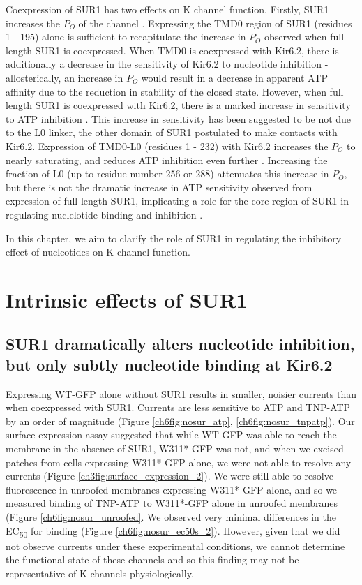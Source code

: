 Coexpression of SUR1 has two effects on K\ATP{} channel function.
Firstly, SUR1 increases the $P_O$ of the channel \cite{tucker_truncation_1997, john_sulphonylurea_1998, chan_n-terminal_2003-1}.
Expressing the TMD0 region of SUR1 (residues 1 - 195) alone is sufficient to recapitulate the increase in $P_O$ observed when full-length SUR1 is coexpressed\cite{babenko_sur_2003-1, chan_n-terminal_2003-1}.
When TMD0 is coexpressed with Kir6.2, there is additionally a decrease in the sensitivity of Kir6.2 to nucleotide inhibition - allosterically, an increase in $P_O$ would result in a decrease in apparent ATP affinity due to the reduction in stability of the closed state.
However, when full length SUR1 is coexpressed with Kir6.2, there is a marked increase in sensitivity to ATP inhibition \cite{tucker_truncation_1997, john_sulphonylurea_1998, chan_n-terminal_2003-1, ribalet_atp-sensitive_2006}.
This increase in sensitivity has been suggested to be not due to the L0 linker, the other domain of SUR1 postulated to make contacts with Kir6.2.
Expression of TMD0-L0 (residues 1 - 232) with Kir6.2 increases the $P_O$ to nearly saturating, and reduces ATP inhibition even further \cite{babenko_sur_2003-1}.
Increasing the fraction of L0 (up to residue number 256 or 288) attenuates this increase in $P_O$, but there is not the dramatic increase in ATP sensitivity observed from expression of full-length SUR1, implicating a role for the core region of SUR1 in regulating nuclelotide binding and inhibition \cite{puljung_cryo-electron_2018}.

In this chapter, we aim to clarify the role of SUR1 in regulating the inhibitory effect of nucleotides on K\ATP{} channel function.

\section{Intrinsic effects of SUR1}

\subsection{SUR1 dramatically alters nucleotide inhibition, but only subtly  nucleotide binding at Kir6.2}
Expressing WT-GFP alone without SUR1 results in smaller, noisier currents than when coexpressed with SUR1.
Currents are less sensitive to ATP and TNP-ATP by an order of magnitude (Figure \ref{ch6fig:nosur_atp}, \ref{ch6fig:nosur_tnpatp}).
Our surface expression assay suggested that while WT-GFP was able to reach the membrane in the absence of SUR1, W311*-GFP was not, and when we excised patches from cells expressing W311*-GFP alone, we were not able to resolve any currents (Figure \ref{ch3fig:surface_expression_2}).
We were still able to resolve fluorescence in unroofed membranes expressing W311*-GFP alone, and so we measured binding of TNP-ATP to W311*-GFP alone in unroofed membranes (Figure \ref{ch6fig:nosur_unroofed}.
We observed very minimal differences in the EC\textsubscript{50} for binding (Figure \ref{ch6fig:nosur_ec50s_2}).
However, given that we did not observe currents under these experimental conditions, we cannot determine the functional state of these channels and so this finding may not be representative of K\ATP{} channels physiologically.

